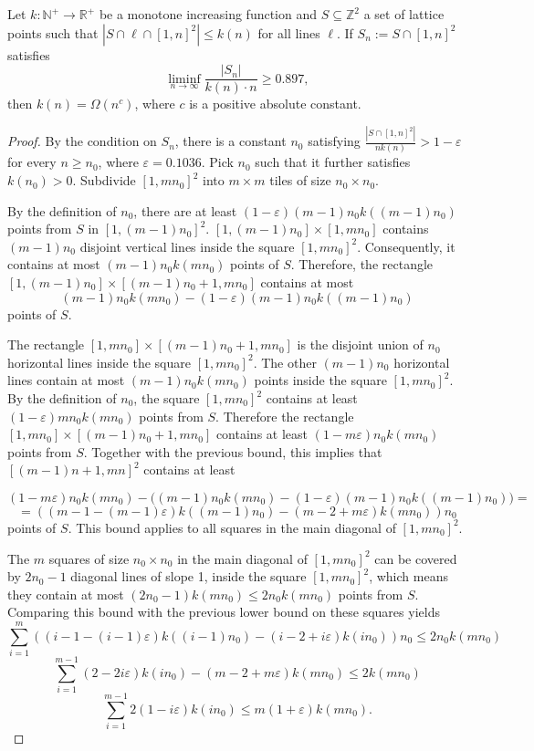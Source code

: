 \documentclass[10pt,a4paper]{amsart}
\newcommand{\nn}{\mathbb{N}}
\newcommand{\zz}{\mathbb{Z}}
\begin{document}
\begin{theorem}
Let $k:\nn^+\to\mathbb{R}^+$ be a monotone increasing function and $S\subseteq\zz^{2}$ a set of lattice points such that $\left|S\cap\ell\cap[1,n]^{2}\right|\le k(n)$ for all lines $\ell$. If $S_n:=S\cap [1,n]^2$ satisfies
$$\liminf_{n\to\infty} \frac{|S_n|}{k(n)\cdot n} \ge 0.897,$$
then $k(n) = \Omega( n^c)$, where $c$ is a positive absolute constant.
\end{theorem}

\begin{proof}
By the condition on $S_n$, there is a constant $n_0$ satisfying $\frac{|S \cap [1,n]^2|}{n k(n)} >1-\varepsilon$ for every $n \ge n_0$, where $\varepsilon=0.1036$. Pick $n_0$ such that it further satisfies $k(n_0) > 0$. Subdivide $[1, mn_0]^2$ into $m\times m$ tiles of size $n_0\times n_0$. 
 
 By the definition of $n_0$, there are at least $(1-\varepsilon)(m-1)n_0k((m-1)n_0)$ points from $S$ in $[1,(m-1)n_0]^2$. $[1,(m-1)n_0]\times[1,mn_0]$ contains $(m-1)n_0$ disjoint vertical lines inside the  square $[1, mn_0]^2$. Consequently, it contains at most $(m-1)n_0k(mn_0)$ points of $S$.
  Therefore, the rectangle $[1,(m-1)n_0]\times[(m-1)n_0+1,mn_0]$ contains at most $$(m-1)n_0k(mn_0)-(1-\varepsilon)(m-1)n_0k((m-1)n_0)$$ points of $S$.  
  
  The rectangle $[1,mn_0]\times[(m-1)n_0+1,mn_0]$ is the disjoint union of $n_0$ horizontal lines inside the square $[1, mn_0]^2$. The other $(m-1)n_0$ horizontal lines contain at most $(m-1)n_0k(mn_0)$ points inside the square $[1, mn_0]^2$. By the definition of $n_0$, the square $[1, mn_0]^2$ contains at least $(1-\varepsilon)mn_0k(mn_0)$ points from $S$. Therefore the rectangle $[1,mn_0]\times[(m-1)n_0+1,mn_0]$ contains at least $(1-m\varepsilon)n_0k(mn_0)$ points from $S$. Together with the previous bound, this implies that $[(m-1)n+1,mn]^2$ contains at least 

  $$   (1-m\varepsilon)n_0k(mn_0)-\big((m-1)n_0k(mn_0)-(1-\varepsilon)(m-1)n_0k((m-1)n_0)\big)=$$ 
 $$=((m-1-(m-1)\varepsilon)k((m-1)n_0)-(m-2+m\varepsilon)k(mn_0))n_0$$
 points of $S$. This bound applies to all squares in the main diagonal of $[1, mn_0]^2$.

The $m$ squares of size $n_0\times n_0$ in the main diagonal of $[1,mn_0]^2$ can be covered by $2n_0-1$ diagonal lines of slope 1, inside the square $[1,mn_0]^2$, which means they contain at most $(2n_0-1)k(mn_0)\le2n_0k(mn_0)$ points from $S$. Comparing this bound with the previous lower bound on these squares yields 
$$\sum_{i=1}^{m}((i-1-(i-1)\varepsilon)k((i-1)n_0)-(i-2+i\varepsilon)k(in_0))n_0\le2n_0k(mn_0)$$
$$\sum_{i=1}^{m-1}(2-2i\varepsilon)k(in_0)-(m-2+m\varepsilon)k(mn_0)\le 2k(mn_0)$$
\begin{equation}
\sum_{i=1}^{m-1}2(1-i\varepsilon)k(in_0)\le m(1+\varepsilon)k(mn_0).
\label{eq:sum_bound}
\end{equation}


\end{proof}
\end{document}
